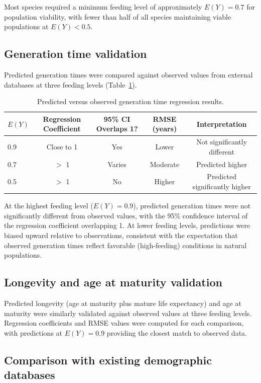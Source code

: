 \documentclass[11pt]{article}
\begin{document}
Most species required a minimum feeding level of approximately $E(Y) = 0.7$ for population viability, with fewer than half of all species maintaining viable populations at $E(Y) < 0.5$.

\subsection{Generation time validation}

Predicted generation times were compared against observed values from external databases at three feeding levels (Table~\ref{tab:gentime}).

\begin{table}[ht]
\centering
\caption{Predicted versus observed generation time regression results.}
\label{tab:gentime}
\begin{tabular}{lcccc}
\toprule
$E(Y)$ & Regression Coefficient & 95\% CI Overlaps 1? & RMSE (years) & Interpretation \\
\midrule
0.9 & Close to 1 & Yes & Lower & Not significantly different \\
0.7 & $>$ 1 & Varies & Moderate & Predicted higher \\
0.5 & $>$ 1 & No & Higher & Predicted significantly higher \\
\bottomrule
\end{tabular}
\end{table}

At the highest feeding level ($E(Y) = 0.9$), predicted generation times were not significantly different from observed values, with the 95\% confidence interval of the regression coefficient overlapping 1. At lower feeding levels, predictions were biased upward relative to observations, consistent with the expectation that observed generation times reflect favorable (high-feeding) conditions in natural populations.

\subsection{Longevity and age at maturity validation}

Predicted longevity (age at maturity plus mature life expectancy) and age at maturity were similarly validated against observed values at three feeding levels. Regression coefficients and RMSE values were computed for each comparison, with predictions at $E(Y) = 0.9$ providing the closest match to observed data.

\subsection{Comparison with existing demographic databases}
\end{document}
